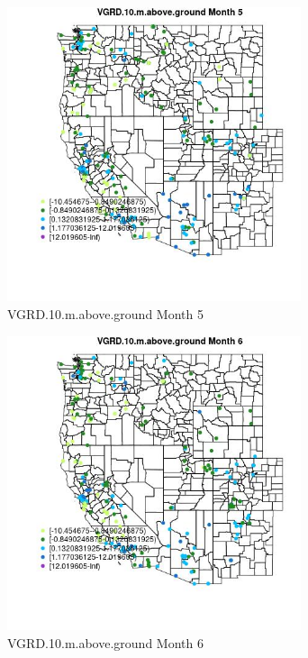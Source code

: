 \begin{figure} 
\centering  
\includegraphics[width=0.77\textwidth]{Code_Outputs/Report_ML_input_PM25_Step4_part_e_de_duplicated_aveswNAs_MapObsMo5VGRD10maboveground.jpg} 
\caption{\label{fig:Report_ML_input_PM25_Step4_part_e_de_duplicated_aveswNAsMapObsMo5VGRD10maboveground}VGRD.10.m.above.ground Month 5} 
\end{figure} 
 

\begin{figure} 
\centering  
\includegraphics[width=0.77\textwidth]{Code_Outputs/Report_ML_input_PM25_Step4_part_e_de_duplicated_aveswNAs_MapObsMo6VGRD10maboveground.jpg} 
\caption{\label{fig:Report_ML_input_PM25_Step4_part_e_de_duplicated_aveswNAsMapObsMo6VGRD10maboveground}VGRD.10.m.above.ground Month 6} 
\end{figure} 
 

